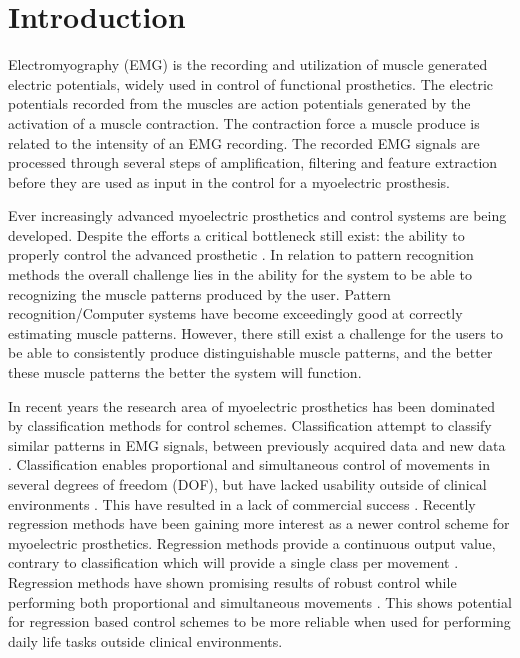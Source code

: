 
\section{Introduction}			%

Electromyography (EMG) is the recording and utilization of muscle generated electric potentials, widely used in control of functional prosthetics. The electric potentials recorded from the muscles are action potentials generated by the activation of a muscle contraction. The contraction force a muscle produce is related to the intensity of an EMG recording. The recorded EMG signals are processed through several steps of amplification, filtering and feature extraction before they are used as input in the control for a myoelectric prosthesis. \cite{Cram2012, Fougner2012} %


Ever increasingly advanced myoelectric prosthetics and control systems are being developed. Despite the efforts a critical bottleneck still exist: the ability to properly control the advanced prosthetic \cite{Hwang2017}. In relation to pattern recognition methods the overall challenge lies in the ability for the system to be able to recognizing the muscle patterns produced by the user. Pattern recognition/Computer systems have become exceedingly good at correctly estimating muscle patterns. However, there still exist a challenge for the users to be able to consistently produce distinguishable muscle patterns, and the better these muscle patterns the better the system will function. \cite{Powell2014}

In recent years the research area of myoelectric prosthetics has been dominated by classification methods for control schemes. Classification attempt to classify similar patterns in EMG signals, between previously acquired data and new data \cite{Mendez2017}. Classification enables proportional and simultaneous control of movements in several degrees of freedom (DOF), but have lacked usability outside of clinical environments \cite{Scheme2010}. This have resulted in a lack of commercial success \cite{Jiang2012}.
Recently regression methods have been gaining more interest as a newer control scheme for myoelectric prosthetics. Regression methods provide a continuous output value, contrary to classification which will provide a single class per movement \cite{Hahne2014}. Regression methods have shown promising results of robust control while performing both proportional and simultaneous movements \cite{Hwang2017, Hahne2014}. This shows potential for regression based control schemes to be more reliable when used for performing daily life tasks outside clinical environments.

